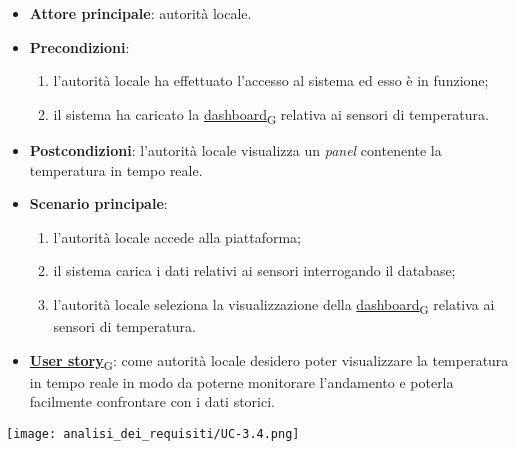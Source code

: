\begin{itemize}
	\item \textbf{Attore principale}: autorità locale.
	\item \textbf{Precondizioni}:
	      \begin{enumerate}
		      \item l'autorità locale ha effettuato l'accesso al sistema ed esso è in funzione;
		      \item il sistema ha caricato la \href{https://7last.github.io/docs/rtb/documentazione-interna/glossario\#dashboard}{dashboard\textsubscript{G}} relativa ai sensori di temperatura.
	      \end{enumerate}
	\item \textbf{Postcondizioni}: l'autorità locale visualizza un \textit{panel} contenente la temperatura in tempo reale.
	\item \textbf{Scenario principale}:
	      \begin{enumerate}
		      \item l'autorità locale accede alla piattaforma;
		      \item il sistema carica i dati relativi ai sensori interrogando il database;
		      \item l'autorità locale seleziona la visualizzazione della \href{https://7last.github.io/docs/rtb/documentazione-interna/glossario\#dashboard}{dashboard\textsubscript{G}} relativa ai sensori di temperatura.
	      \end{enumerate}
	\item \href{https://7last.github.io/docs/rtb/documentazione-interna/glossario\#user-story}{\textbf{User story}\textsubscript{G}}:
	      come autorità locale desidero poter visualizzare la temperatura in tempo reale in modo da poterne monitorare l'andamento
	      e poterla facilmente confrontare con i dati storici.
\end{itemize}
\begin{center}
	\texttt{[image: analisi\_dei\_requisiti/UC-3.4.png]}
\end{center}

\newpage

